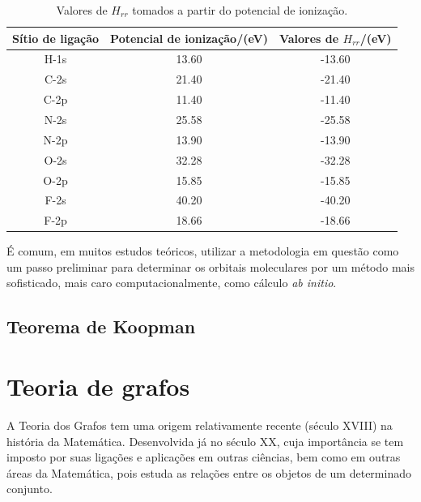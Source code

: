 \begin{table}[htb]
	\centering
	\caption{\label{qua:Quadro_1} Valores de $H_{rr}$ tomados a partir do potencial de ionização.}	
	\begin{tabular}{ccc}
		\toprule
		\textbf{Sítio de ligação} & \textbf{Potencial de ionização/(eV)} & \textbf{Valores de $H_{rr}$/(eV)}
		\\ 
		\midrule
        H-1s & 13.60 & -13.60 \\
        C-2s & 21.40 & -21.40 \\
        C-2p & 11.40 & -11.40 \\
        N-2s & 25.58 & -25.58 \\
        N-2p & 13.90 & -13.90 \\
        O-2s & 32.28 & -32.28 \\
        O-2p & 15.85 & -15.85 \\
        F-2s & 40.20 & -40.20 \\
        F-2p & 18.66 & -18.66 \\
    \bottomrule
	\end{tabular}
\end{table}

É comum, em muitos estudos teóricos\autocite{Zubatiuk2021, BroJrgensen2021}, utilizar a metodologia em questão como um passo preliminar para determinar os orbitais moleculares por um método mais sofisticado, mais caro computacionalmente, como cálculo \textit{ab initio}.

\section{Teorema de Koopman}



\chapter{Teoria de grafos} \label{ap:graph}

A Teoria dos Grafos tem uma origem relativamente recente (século XVIII) na
história da Matemática. Desenvolvida já no século XX, cuja importância se tem
imposto por suas ligações e aplicações em outras ciências, bem como em outras
áreas da Matemática, pois estuda as relações entre os objetos de um determinado conjunto\autocite{neto2016topicos, soares2014introduccao}.

